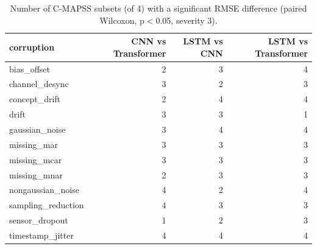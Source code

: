 \begin{table}
\caption{Number of C-MAPSS subsets (of 4) with a significant RMSE difference (paired Wilcoxon, p$<$0.05, severity 3).}
\label{tab:sig}
\begin{tabular}{lrrr}
\toprule  %
corruption & CNN vs Transformer & LSTM vs CNN & LSTM vs Transformer \\
\midrule
bias\_offset & 2 & 3 & 4 \\
channel\_desync & 3 & 2 & 3 \\
concept\_drift & 2 & 4 & 4 \\
drift & 3 & 3 & 1 \\
gaussian\_noise & 3 & 4 & 4 \\
missing\_mar & 3 & 3 & 3 \\
missing\_mcar & 3 & 3 & 3 \\
missing\_mnar & 2 & 3 & 3 \\
nongaussian\_noise & 4 & 2 & 4 \\
sampling\_reduction & 4 & 3 & 3 \\
sensor\_dropout & 1 & 2 & 3 \\
timestamp\_jitter & 4 & 4 & 4 \\
\bottomrule
\end{tabular}
\end{table}
